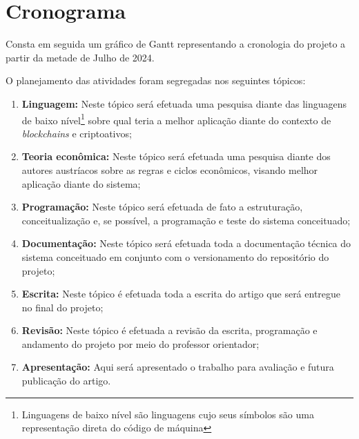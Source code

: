 \chapter{Cronograma}
Consta em seguida um gráfico de Gantt representando a cronologia do projeto a partir da metade de Julho de 2024.
 
O planejamento das atividades foram segregadas nos seguintes tópicos:

\begin{enumerate}
    \item \textbf{Linguagem:} Neste tópico será efetuada uma pesquisa diante das linguagens de baixo nível\footnote{Linguagens de baixo nível são linguagens cujo seus símbolos são uma representação direta do código de máquina} sobre qual teria a melhor aplicação diante do contexto de \textit{blockchains} e criptoativos;
    
    \item \textbf{Teoria econômica:} Neste tópico será efetuada uma pesquisa diante dos autores austríacos sobre as regras e ciclos econômicos, visando melhor aplicação diante do sistema;
    
    \item \textbf{Programação:} Neste tópico será efetuada de fato a estruturação, conceitualização e, se possível, a programação e teste do sistema conceituado;
    
    \item \textbf{Documentação:} Neste tópico será efetuada toda a documentação técnica do sistema conceituado em conjunto com o versionamento do repositório do projeto;
    
    \item \textbf{Escrita:} Neste tópico é efetuada toda a escrita do artigo que será entregue no final do projeto;
    
    \item \textbf{Revisão:} Neste tópico é efetuada a revisão da escrita, programação e andamento do projeto por meio do professor orientador;
    
    \item \textbf{Apresentação:} Aqui será apresentado o trabalho para avaliação e futura publicação do artigo. 

\end{enumerate}

